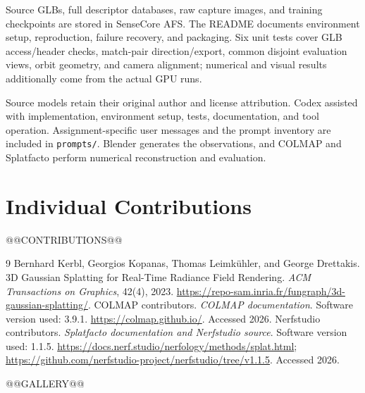 \documentclass{article}
\begin{document}
Source GLBs, full descriptor databases, raw capture images, and training checkpoints are stored in SenseCore AFS. The README documents environment setup, reproduction, failure recovery, and packaging. Six unit tests cover GLB access/header checks, match-pair direction/export, common disjoint evaluation views, orbit geometry, and camera alignment; numerical and visual results additionally come from the actual GPU runs.

Source models retain their original author and license attribution. Codex assisted with implementation, environment setup, tests, documentation, and tool operation. Assignment-specific user messages and the prompt inventory are included in \texttt{prompts/}. Blender generates the observations, and COLMAP and Splatfacto perform numerical reconstruction and evaluation.

\section{Individual Contributions}
\begin{enumerate}
@@CONTRIBUTIONS@@
\end{enumerate}

\begin{thebibliography}{9}
Bernhard Kerbl, Georgios Kopanas, Thomas Leimk\"uhler, and George Drettakis.
3D Gaussian Splatting for Real-Time Radiance Field Rendering.
\emph{ACM Transactions on Graphics}, 42(4), 2023.
\url{https://repo-sam.inria.fr/fungraph/3d-gaussian-splatting/}.
COLMAP contributors. \emph{COLMAP documentation}. Software version used: 3.9.1.
\url{https://colmap.github.io/}. Accessed 2026.
Nerfstudio contributors. \emph{Splatfacto documentation and Nerfstudio source}.
Software version used: 1.1.5.
\url{https://docs.nerf.studio/nerfology/methods/splat.html};
\url{https://github.com/nerfstudio-project/nerfstudio/tree/v1.1.5}. Accessed 2026.
\end{thebibliography}

\appendix
@@GALLERY@@
\end{document}
